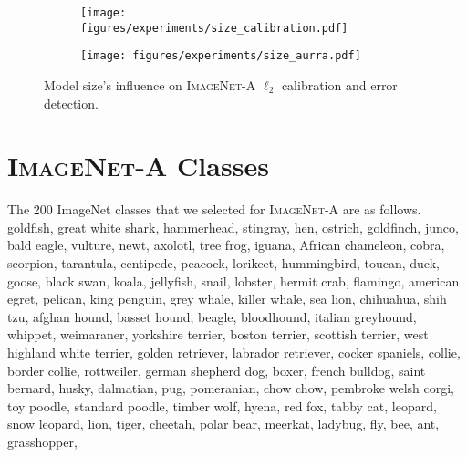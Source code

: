 \documentclass[10pt,twocolumn,letterpaper]{article}
\begin{document}
\begin{figure}
\begin{subfigure}{.48\textwidth}
    \centering
    \texttt{[image: figures/experiments/size\_calibration.pdf]}
\end{subfigure}
\begin{subfigure}{.48\textwidth}
    \centering
    \texttt{[image: figures/experiments/size\_aurra.pdf]}
\end{subfigure}\caption{Model size's influence on \textsc{ImageNet-A} $\ell_2$ calibration and error detection.}\end{figure}


\newpage
\newpage

\section{\textsc{ImageNet-A} Classes}\label{app:classes}
The 200 ImageNet classes that we selected for \textsc{ImageNet-A} are as follows.
goldfish, \quad 
great white shark, \quad 
hammerhead, \quad 
stingray, \quad 
hen, \quad 
ostrich, \quad 
goldfinch, \quad 
junco, \quad 
bald eagle, \quad 
vulture, \quad 
newt, \quad 
axolotl, \quad 
tree frog, \quad 
iguana, \quad 
African chameleon, \quad 
cobra, \quad 
scorpion, \quad 
tarantula, \quad 
centipede, \quad 
peacock, \quad 
lorikeet, \quad 
hummingbird, \quad 
toucan, \quad 
duck, \quad 
goose, \quad 
black swan, \quad 
koala, \quad 
jellyfish, \quad 
snail, \quad 
lobster, \quad 
hermit crab, \quad 
flamingo, \quad 
american egret, \quad 
pelican, \quad 
king penguin, \quad 
grey whale, \quad 
killer whale, \quad 
sea lion, \quad 
chihuahua, \quad 
shih tzu, \quad 
afghan hound, \quad 
basset hound, \quad 
beagle, \quad 
bloodhound, \quad 
italian greyhound, \quad 
whippet, \quad 
weimaraner, \quad 
yorkshire terrier, \quad 
boston terrier, \quad 
scottish terrier, \quad 
west highland white terrier, \quad 
golden retriever, \quad 
labrador retriever, \quad 
cocker spaniels, \quad 
collie, \quad 
border collie, \quad 
rottweiler, \quad 
german shepherd dog, \quad 
boxer, \quad 
french bulldog, \quad 
saint bernard, \quad 
husky, \quad 
dalmatian, \quad 
pug, \quad 
pomeranian, \quad 
chow chow, \quad 
pembroke welsh corgi, \quad 
toy poodle, \quad 
standard poodle, \quad 
timber wolf, \quad 
hyena, \quad 
red fox, \quad 
tabby cat, \quad 
leopard, \quad 
snow leopard, \quad 
lion, \quad 
tiger, \quad 
cheetah, \quad 
polar bear, \quad 
meerkat, \quad 
ladybug, \quad 
fly, \quad 
bee, \quad 
ant, \quad 
grasshopper, \quad 
\end{document}
